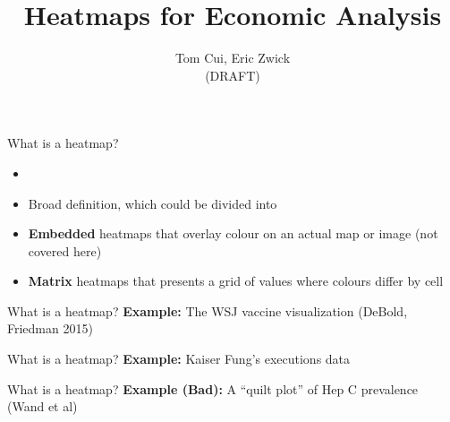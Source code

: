


\def \mainroot{..}
\def \figroot{\mainroot/figures/heatmaps}


\title{Heatmaps for Economic Analysis}
\author{Tom Cui, Eric Zwick \\ (DRAFT)}




\begin{frame}
\titlepage
\end{frame}


\begin{frame}{What is a heatmap?}
        \begin{itemize}
                \item {}
             \item Broad definition, which could be divided into
             \item \textbf{Embedded} heatmaps that overlay colour on an actual map or image (not covered here)
             \item \textbf{Matrix} heatmaps that presents a grid of values where colours differ by cell
        \end{itemize}
\end{frame}

\begin{frame}{What is a heatmap?}
        \textbf{Example:} The WSJ vaccine visualization (DeBold, Friedman 2015)
\end{frame}

\begin{frame}{What is a heatmap?}
        \textbf{Example:} Kaiser Fung's executions data

        \vspace{0.2in}

\end{frame}

\begin{frame}{What is a heatmap?}
        \textbf{Example (Bad):} A ``quilt plot'' of Hep C prevalence (Wand et al)

        \vspace{0.2in}

\end{frame}

